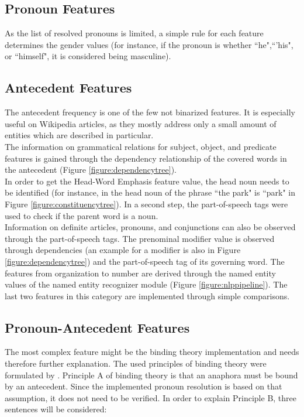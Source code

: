 \subsection{Pronoun Features}
As the list of resolved pronouns is limited, a simple rule for each feature determines the gender values (for instance, if the pronoun is whether ``he",``'his", or ``himself", it is considered being masculine). 

\subsection{Antecedent Features}
The antecedent frequency is one of the few not binarized features. It is especially useful on Wikipedia articles, as they mostly address only a small amount of entities which are described in particular. \\
The information on grammatical relations for subject, object, and predicate features is gained through the dependency relationship of the covered words in the antecedent (Figure  \ref{figure:dependencytree}).\\
In order to get the Head-Word Emphasis feature value, the head noun needs to be identified (for instance, in the head noun of the phrase ``the park" is ``park" in Figure \ref{figure:constituencytree}). In a second step, the part-of-speech tags were used to check if the parent word is a noun.\\
Information on definite articles, pronouns, and conjunctions can also be observed through the part-of-speech tags.
The prenominal modifier value is observed through dependencies (an example for a modifier is also in Figure \ref{figure:dependencytree}) and the part-of-speech tag of its governing word. 
The features from organization to number are derived through the named entity values of the named entity recognizer module (Figure \ref{figure:nlppipeline}).
The last two features in this category are implemented through simple comparisons.

\subsection{Pronoun-Antecedent Features}
The most complex feature might be the binding theory implementation and needs therefore further explanation. The used principles of binding theory were formulated by \cite{chomsky1993lectures}. Principle A of binding theory is that an anaphora must be bound by an antecedent. Since the implemented pronoun resolution is based on that assumption, it does not need to be verified. In order to explain Principle B, three sentences will be considered:

